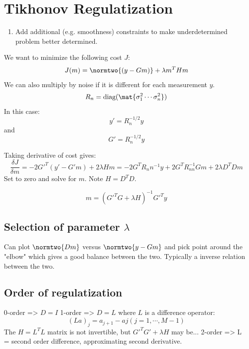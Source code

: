 \documentclass{homework}
\title{}
\author{Sean Jennings}
\date{}
\begin{document}
\maketitle

\section{Tikhonov Regulatization}
\begin{enumerate}
    \item Add additional (e.g. smoothness) constraints to make underdetermined
        problem better determined.
\end{enumerate}

We want to minimize the following cost $J$: 
\begin{equation*}
    J(m) = \normtwo{(y-Gm)} + \lambda m^T H m
\end{equation*}
We can also multiply by noise if it is different for each measurement $y$.
\begin{equation*}
    R_n = \text{diag} (\mat{\sigma_1^2 \cdots \sigma_n^2})
\end{equation*}
In this case:
\begin{equation*}
    y' = R_n^{-1/2} y
\end{equation*}
and 
\begin{equation*}
    G' = R_n^{-1/2} y
\end{equation*}

Taking derivative of cost gives:
\begin{equation*}
    \frac{\delta J} {\delta m} = -2G'^T (y' - G'm) + 2 \lambda Hm
        = -2 G^T R_nn^{-1} y + 2 G^T R_{nn}^{-1} G m + 2 \lambda D^T D m
\end{equation*}
Set to zero and solve for $m$. Note $H = D^T D$.

\begin{equation*}
    m = (G'^T G + \lambda H)^{-1} G'^T y
\end{equation*}

\subsection{Selection of parameter $\lambda$}
Can plot $\normtwo{Dm}$ versus $\normtwo{y - Gm}$ and pick point around the
"elbow" which gives a good balance between the two. Typically a inverse relation
between the two.

\subsection{Order of regulatization}
0-order => $D = I$
1-order => $D = L$ where $L$ is a difference operator:
\begin{equation*}
    (La)_j = a_{j+1} - a{j}  (j=1, \cdots, M-1)
\end{equation*}
The $H = L^T L$ matrix is not invertible, but  $G'^T G' + \lambda H$ may be...
2-order => L = second order difference, approximating second derivative.
\end{document}
